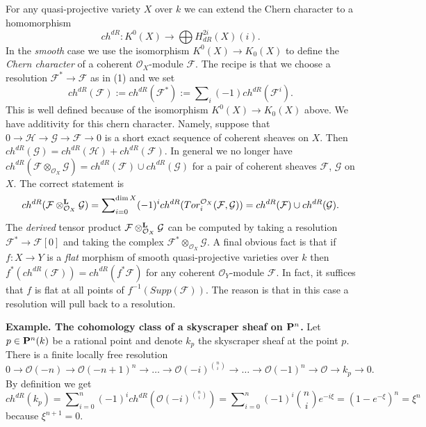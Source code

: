 \noindent
For any quasi-projective variety $X$ over $k$ we can extend the 
Chern character to a homomorphism
$$
ch^{dR} : K^0(X) \longrightarrow \bigoplus H^{2i}_{dR}(X)(i).
$$
In the {\it smooth} case we use the isomorphism $K^0(X) \to K_0(X)$
to define the {\it Chern character} of a coherent ${\mathcal O}_X$-module
${\mathcal F}$. The recipe is that we choose a resolution
${\mathcal F}^* \to {\mathcal F}$ as in (1) and we set
$$
ch^{dR}({\mathcal F})
:=
ch^{dR}({\mathcal F}^*)
:=
\sum\nolimits_i (-1)ch^{dR}({\mathcal F}^i).
$$
This is well defined because of the isomorphism $K^0(X) \to K_0(X)$
above. We have additivity for this chern character. Namely, suppose
that
$
0
\to
{\mathcal H}
\to 
{\mathcal G}
\to 
{\mathcal F}
\to 
0
$
is a short exact sequence of coherent sheaves on $X$. Then
$ch^{dR}({\mathcal G}) = ch^{dR}({\mathcal H}) + ch^{dR}({\mathcal F})$.
In general we no longer have $ch^{dR}({\mathcal F}\otimes_{{\mathcal O}_X}
{\mathcal G}) = ch^{dR}({\mathcal F}) \cup ch^{dR}({\mathcal G})$
for a pair of coherent sheaves ${\mathcal F}$, ${\mathcal G}$ on $X$.
The correct statement is
$$
ch^{dR}({\mathcal F}\otimes^{\bf L}_{{\mathcal O}_X}{\mathcal G})
=
\sum\nolimits_{i=0}^{\dim X}
(-1)^i
ch^{dR}(Tor_i^{{\mathcal O}_X}({\mathcal F},{\mathcal G}))
=
ch^{dR}({\mathcal F}) \cup ch^{dR}({\mathcal G}).
$$
The {\it derived} tensor product
${\mathcal F}\otimes^{\bf L}_{{\mathcal O}_X}{\mathcal G}$ can be
computed by taking a resolution ${\mathcal F}^* \to {\mathcal F}[0]$
and taking the complex ${\mathcal F}^*\otimes_{{\mathcal O}_X} {\mathcal G}$.
A final obvious fact is that if $f : X \to Y$ is a {\it flat}
morphism of smooth quasi-projective varieties over $k$ then
$f^*( ch^{dR}({\mathcal F}) ) = ch^{dR}(f^*{\mathcal F})$ for any
coherent ${\mathcal O}_Y$-module ${\mathcal F}$. In fact, it suffices
that $f$ is flat at all points of $f^{-1}(Supp({\mathcal F}))$.
The reason is that in this case a resolution will pull
back to a resolution.

\medskip\noindent
{\bf Example. The cohomology class of a skyscraper sheaf on
${\bf P}^n$.} Let $p\in {\bf P}^n(k)$ be a rational point
and denote $k_p$ the skyscraper sheaf at the point $p$.
There is a finite locally free resolution
$$
0
\to
{\mathcal O}(-n)
\to
{\mathcal O}(-n+1)^n
\to
\ldots
\to
{\mathcal O}(-i)^{\binom{n}{i}}
\to
\ldots
\to
{\mathcal O}(-1)^n
\to
{\mathcal O}
\to
k_p
\to
0.
$$
By definition we get
$$
ch^{dR}(k_p)
= 
\sum\nolimits_{i=0}^n
(-1)^i
ch^{dR}( {\mathcal O}(-i)^{\binom{n}{i}} )
=
\sum\nolimits_{i=0}^n
(-1)^i \binom{n}{i} e^{-i \xi}
=
(1 - e^{-\xi})^n 
=
\xi^n
$$
because $\xi^{n+1} = 0$.



























